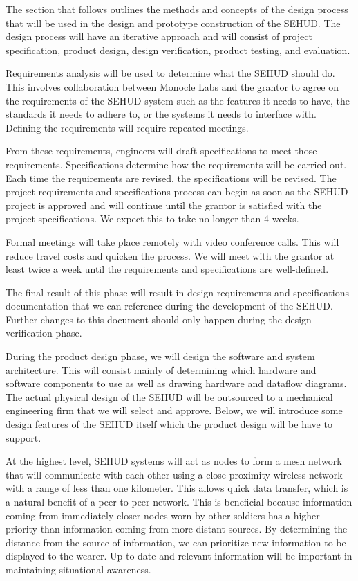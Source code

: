 The section that follows outlines the methods and concepts of the design
process that will be used in the design and prototype construction of the
SEHUD. The design process will have an iterative approach and will consist of
project specification, product design, design verification, product testing,
and evaluation.

Requirements analysis will be used to determine what the SEHUD should do.
This involves collaboration between Monocle Labs and the grantor to agree on
the requirements of the SEHUD system such as the features it needs to have,
the standards it needs to adhere to, or the systems it needs to interface
with. Defining the requirements will require repeated meetings.

From these requirements, engineers will draft specifications to meet those
requirements. Specifications determine how the requirements will be
carried out. Each time the requirements are revised, the specifications will
be revised. The project requirements and specifications process can begin as
soon as the SEHUD project is approved and will continue until the grantor is
satisfied with the project specifications. We expect this to take no longer
than 4 weeks.

Formal meetings will take place remotely with video conference calls. This
will reduce travel costs and quicken the process. We will meet with the
grantor at least twice a week until the requirements and specifications are
well-defined.

The final result of this phase will result in design requirements and
specifications documentation that we can reference during the development of
the SEHUD. Further changes to this document should only happen during the
design verification phase.

During the product design phase, we will design the software and system
architecture. This will consist mainly of determining which hardware and
software components to use as well as drawing hardware and dataflow diagrams.
The actual physical design of the SEHUD will be outsourced to a mechanical
engineering firm that we will select and approve. Below, we will introduce
some design features of the SEHUD itself which the product design will be
have to support.

At the highest level, SEHUD systems will act as nodes to form a mesh network
that will communicate with each other using a close-proximity wireless
network with a range of less than one kilometer. This allows quick data
transfer, which is a natural benefit of a peer-to-peer network. This is
beneficial because information coming from immediately closer nodes worn by
other soldiers has a higher priority than information coming from more
distant sources. By determining the distance from the source of information,
we can prioritize new information to be displayed to the wearer. Up-to-date
and relevant information will be important in maintaining situational
awareness.

